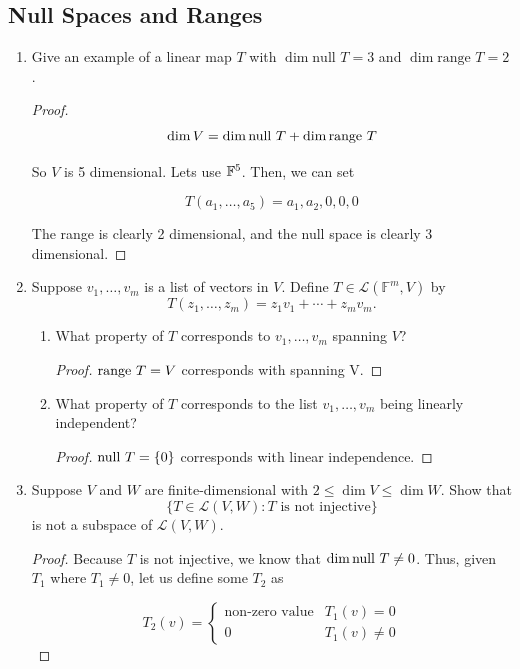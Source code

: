 \subsection{Null Spaces and Ranges}


\begin{enumerate}
    \item[1] Give an example of a linear map $T$ with $\dim \text{null } T = 3$ and $\dim \text{range } T = 2$.
    
    \begin{proof}
        $$\dim V = \dim \text{null } T + \dim \text{range } T$$

        So $V$ is 5 dimensional. Lets use $\mathbb{F}^5$. Then, we can set 

        $$T(a_1, \dots, a_5) = a_1, a_2, 0, 0, 0$$

        The range is clearly 2 dimensional, and the null space is clearly 3 dimensional. 
    \end{proof}


    \item[3] Suppose $v_1,\dots,v_m$ is a list of vectors in $V$. Define
    $T\in\mathcal L(\mathbb F^m,V)$ by
    \[T(z_1,\dots,z_m)=z_1v_1+\cdots+z_mv_m.\]
    \begin{enumerate}
        \item What property of $T$ corresponds to $v_1,\dots,v_m$ spanning $V$?
        \begin{proof}
            $\text{range } T = V$ corresponds with spanning V.
        \end{proof}
        \item What property of $T$ corresponds to the list $v_1,\dots,v_m$ being linearly independent?
        \begin{proof}
            $\text{null } T = \{0\}$ corresponds with linear independence.
        \end{proof}
    \end{enumerate}

    \item[7] Suppose $V$ and $W$ are finite-dimensional with
    $2 \leq \dim V \leq \dim W$. Show that
    \[
        \{T \in \mathcal{L}(V, W) : T \text{ is not injective}\}
    \]
    is not a subspace of $\mathcal{L}(V, W)$.

    \begin{proof}
        Because $T$ is not injective, we know that $\dim \text{null } T \neq 0$. Thus, given $T_1$ where $T_1 \neq 0$, let us define some $T_2$ as 

        $$
        T_2(v) = \begin{cases}
            \text{non-zero value} & T_1(v) = 0 \\
            0 & T_1(v) \neq 0
        \end{cases}
        $$


\end{proof}
\end{enumerate}
